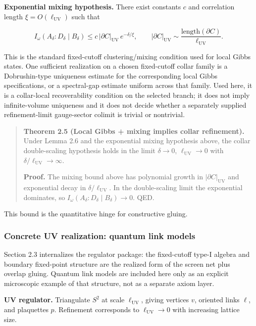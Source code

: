 \textbf{Exponential mixing hypothesis.} There exist constants \(c\) and correlation length \(\xi = O(\ell_{\mathrm{UV}})\) such that

\[
I_\omega(A_\delta:D_\delta \mid B_\delta) \le
c\,\lvert\partial C\rvert_{\mathrm{UV}}\,e^{-\delta/\xi},
\qquad
\lvert\partial C\rvert_{\mathrm{UV}} \sim \frac{\mathrm{length}(\partial C)}{\ell_{\mathrm{UV}}}.
\]

This is the standard fixed-cutoff clustering/mixing condition used for local Gibbs states. One
sufficient realization on a chosen fixed-cutoff collar family is a Dobrushin-type uniqueness estimate
for the corresponding local Gibbs specifications, or a spectral-gap estimate uniform across that
family. Used here, it is
a collar-local recoverability condition on the selected branch; it does not imply infinite-volume
uniqueness and it does not decide whether a separately supplied refinement-limit gauge-sector
colimit is trivial or nontrivial.

\begin{quote}
\textbf{Theorem 2.5 (Local Gibbs + mixing implies collar refinement).} Under Lemma 2.6 and the exponential mixing hypothesis above, the collar double-scaling hypothesis holds in the limit \(\delta \to 0\), \(\ell_{\mathrm{UV}} \to 0\) with \(\delta/\ell_{\mathrm{UV}} \to \infty\).

\textbf{Proof.} The mixing bound above has polynomial growth in \(\lvert\partial C\rvert_{\mathrm{UV}}\) and exponential decay in \(\delta/\ell_{\mathrm{UV}}\). In the double-scaling limit the exponential dominates, so \(I_\omega(A_\delta:D_\delta \mid B_\delta) \to 0\). QED.
\end{quote}

This bound is the quantitative hinge for constructive gluing.

\subsubsection{Concrete UV realization: quantum link models}\label{26-concrete-uv-realization-quantum-link-models}

Section 2.3 internalizes the regulator package: the fixed-cutoff type-I algebra and boundary fixed-point structure are the realized form of the screen net plus overlap gluing. Quantum link models are included here only as an explicit microscopic example of that structure, not as a separate axiom layer.

\textbf{UV regulator.} Triangulate \(S^2\) at scale \(\ell_{\mathrm{UV}}\), giving vertices \(v\), oriented links \(\ell\), and plaquettes \(p\). Refinement corresponds to \(\ell_{\mathrm{UV}} \to 0\) with increasing lattice size.

